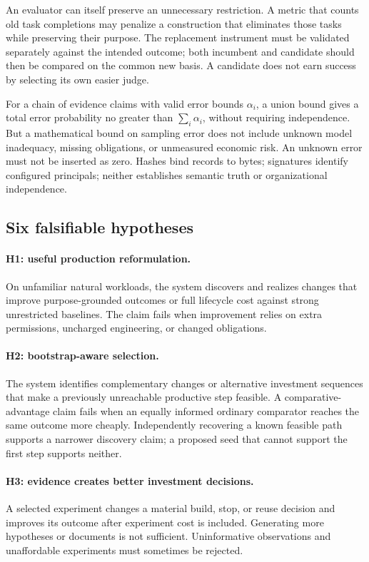 \documentclass[11pt,letterpaper]{article}
\newcommand{\1}{\mathbf 1}
\theoremstyle{remark}\newtheorem{remark}{Remark}[section]
\begin{document}
An evaluator can itself preserve an unnecessary restriction. A metric that counts old task completions may penalize a construction that eliminates those tasks while preserving their purpose. The replacement instrument must be validated separately against the intended outcome; both incumbent and candidate should then be compared on the common new basis. A candidate does not earn success by selecting its own easier judge.

For a chain of evidence claims with valid error bounds $\alpha_i$, a union bound gives a total error probability no greater than $\sum_i\alpha_i$, without requiring independence. But a mathematical bound on sampling error does not include unknown model inadequacy, missing obligations, or unmeasured economic risk. An unknown error must not be inserted as zero. Hashes bind records to bytes; signatures identify configured principals; neither establishes semantic truth or organizational independence.

\subsection{Six falsifiable hypotheses}
\paragraph{H1: useful production reformulation.}
On unfamiliar natural workloads, the system discovers and realizes changes that improve purpose-grounded outcomes or full lifecycle cost against strong unrestricted baselines. The claim fails when improvement relies on extra permissions, uncharged engineering, or changed obligations.

\paragraph{H2: bootstrap-aware selection.}
The system identifies complementary changes or alternative investment sequences that make a previously unreachable productive step feasible. A comparative-advantage claim fails when an equally informed ordinary comparator reaches the same outcome more cheaply. Independently recovering a known feasible path supports a narrower discovery claim; a proposed seed that cannot support the first step supports neither.

\paragraph{H3: evidence creates better investment decisions.}
A selected experiment changes a material build, stop, or reuse decision and improves its outcome after experiment cost is included. Generating more hypotheses or documents is not sufficient. Uninformative observations and unaffordable experiments must sometimes be rejected.
\end{document}
